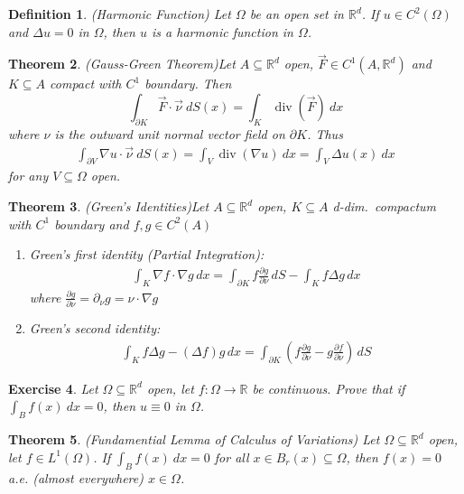 \documentclass{report}
\theoremstyle{tommy}
\newtheorem{defn}{Definition}
\newtheorem{thm}[defn]{Theorem}
\newtheorem{ex}[defn]{Exercise}
\renewcommand\div{\operatorname{div}}
\begin{document}
\begin{defn} (Harmonic Function)
  Let \(\Omega\) be an open set in \(\mathbb{R}^d\). If \(u \in C^2(\Omega)\) and \(\Delta u = 0\) in \(\Omega\), then \(u\) is a harmonic function in \(\Omega\).
\end{defn}

\begin{thm} (Gauss-Green Theorem)\label{gauss-green}
  Let \(A \subseteq \mathbb{R}^d\) open, \(\vec{F} \in C^1(A, \mathbb{R}^d)\) and \(K \subseteq A\) compact with \(C^1\) boundary. Then
  \[ \int_{\partial K} \vec{F} \cdot \vec{\nu}\ dS(x) = \int_K \div(\vec{F})\ dx \]
  where \(\nu\) is the outward unit normal vector field on \(\partial K\).
Thus
\begin{align*}
  \int_{\partial V} \nabla u \cdot \vec{\nu}\ dS(x)
  = \int_V \div(\nabla u) \ dx
  = \int_V \Delta u(x) \ dx
\end{align*}
for any \(V \subseteq \Omega \) open.
\end{thm}


\begin{thm} (Green's Identities)\label{green-identities}
  Let \(A \subseteq \mathbb{R}^d\) open, \(K \subseteq A\) d-dim.\ compactum with \(C^1\) boundary and \(f, g \in C^2(A)\)
  \begin{enumerate}
    \item Green's first identity (Partial Integration): \begin{align*}
      \int_K \nabla f \cdot \nabla g \, dx = \int_{\partial K} f \frac{\partial g}{\partial \nu} \, dS - \int_K f \Delta g \, dx
    \end{align*}
    where \(\frac{\partial g}{\partial \nu} = \partial_\nu g = \nu \cdot \nabla g\)
    \item Green's second identity: \begin{align*}
      \int_K f \Delta g - (\Delta f) g \, dx = \int_{\partial K} \left(f \frac{\partial g}{\partial \nu} - g \frac{\partial f}{\partial \nu}\right) \, dS
    \end{align*}
  \end{enumerate}
\end{thm}

\begin{ex}
  Let \(\Omega \subseteq \mathbb{R}^d\) open, let \(f: \Omega \to \mathbb{R}\) be continuous. Prove that if \( \int_B f(x) \ dx = 0 \), then \( u \equiv 0 \) in \(\Omega\).
\end{ex}

\begin{thm} (Fundamential Lemma of Calculus of Variations)
  Let \(\Omega \subseteq \mathbb{R}^d\) open, let \(f \in L^1(\Omega)\). If 
  \(\int_B f(x) \ dx = 0\) for all \(x \in B_r(x) \subseteq \Omega\), then \(f(x) = 0\) a.e. (almost everywhere) \(x \in \Omega\).
\end{thm}
\end{document}

